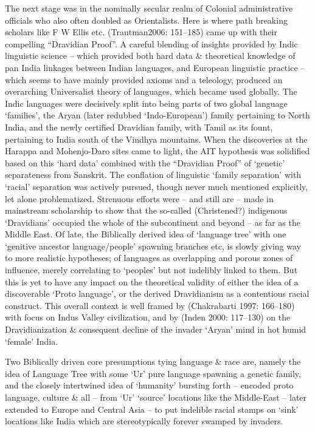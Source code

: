 The next stage was in the nominally secular realm of Colonial administrative officials who also often doubled as Orientalists. Here is where path breaking scholars like F W Ellis etc. (Trautman2006: 151–185) came up with their compelling “Dravidian Proof”. A careful blending of insights provided by Indic linguistic science – which provided both hard data \& theoretical knowledge of pan India linkages between Indian languages, and European linguistic practice – which seems to have mainly provided axioms and a teleology, produced an overarching Universalist theory of languages, which became used globally. The Indic languages were decisively split into being parts of two global language ‘families’, the Aryan (later redubbed ‘Indo-European’) family pertaining to North India, and the newly certified Dravidian family, with Tamil as its fount, pertaining to India south of the Vindhya mountains. When the discoveries at the Harappa and Mohenjo-Daro sites came to light, the AIT hypothesis was solidified based on this ‘hard data’ combined with the “Dravidian Proof” of ‘genetic’ separateness from Sanskrit. The conflation of linguistic ‘family separation’ with ‘racial’ separation was actively pursued, though never much mentioned explicitly, let alone problematized. Strenuous efforts were – and still are – made in mainstream scholarship to show that the so-called (Christened?) indigenous ‘Dravidians’ occupied the whole of the subcontinent and beyond – as far as the Middle East. Of late, the Biblically derived idea of ‘language tree’ with one ‘genitive ancestor language/people’ spawning branches etc, is slowly giving way to more realistic hypotheses; of languages as overlapping and porous zones of influence, merely correlating to ‘peoples’ but not indelibly linked to them. But this is yet to have any impact on the theoretical validity of either the idea of a discoverable ‘Proto language’, or the derived Dravidianism as a contentious racial construct. This overall context is well framed by (Chakrabarti 1997: 166–180) with focus on Indus Valley civilization, and by (Inden 2000: 117–130) on the Dravidianization \& consequent decline of the invader ‘Aryan’ mind in hot humid ‘female’ India.

Two Biblically driven core presumptions tying language \& race are, namely the idea of Language Tree with some ‘Ur’ pure language spawning a genetic family, and the closely intertwined idea of ‘humanity’ bursting forth – encoded proto language, culture \& all – from ‘Ur’ ‘source’ locations like the Middle-East – later extended to Europe and Central Asia – to put indelible racial stamps on ‘sink’ locations like India which are stereotypically forever swamped by invaders.

